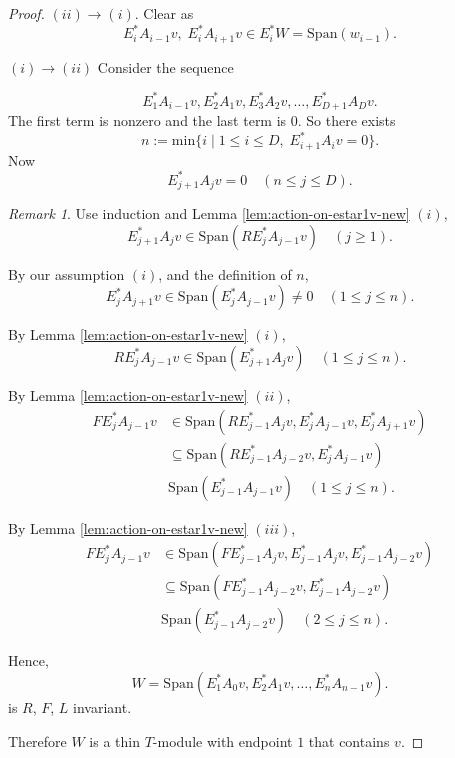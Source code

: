 \documentclass[
]{book}
\theoremstyle{definition}
\theoremstyle{definition}
\theoremstyle{definition}
\theoremstyle{definition}
\theoremstyle{remark}
\newtheorem*{remark}{Remark}
\begin{document}
\begin{proof}
\((ii)\to(i)\). Clear as
\[E^*_iA_{i-1}v, \; E^*_iA_{i+1}v \in E^*_iW = \mathrm{Span}(w_{i-1}).\]

\((i)\to(ii)\) Consider the sequence

\[E^*_1A_{i-1}v, E^*_2A_1v, E^*_3A_2v, \ldots, E^*_{D+1}A_Dv.\]
The first term is nonzero and the last term is \(0\).
So there exists
\[n := \mathrm{min}\{i\mid 1\leq i\leq D, \; E^*_{i+1}A_iv = 0\}.\]
Now
\begin{equation}
E^*_{j+1}A_jv = 0 \quad (n\leq j\leq D). \label{eq:n}
\end{equation}

\begin{remark}
Use induction and Lemma \ref{lem:action-on-estar1v-new} \((i)\),
\[E^*_{j+1}A_jv \in \mathrm{Span}(RE^*_jA_{j-1}v) \quad (j\geq 1).\]
\end{remark}

By our assumption \((i)\), and the definition of \(n\),
\[E^*_jA_{j+1}v \in \mathrm{Span}(E^*_jA_{j-1}v)\neq 0 \quad (1\leq j\leq n).\]

By Lemma \ref{lem:action-on-estar1v-new} \((i)\),
\[RE^*_jA_{j-1}v \in \mathrm{Span}(E^*_{j+1}A_jv) \quad (1\leq j\leq n).\]

By Lemma \ref{lem:action-on-estar1v-new} \((ii)\),
\begin{align}
FE^*_jA_{j-1}v & \in \mathrm{Span}(RE^*_{j-1}A_jv, E^*_jA_{j-1}v, E^*_jA_{j+1}v)\\
& \subseteq \mathrm{Span}(RE^*_{j-1}A_{j-2}v, E^*_jA_{j-1}v)\\
& \mathrm{Span}(E^*_{j-1}A_{j-1}v) \quad (1\leq j\leq n).
\end{align}

By Lemma \ref{lem:action-on-estar1v-new} \((iii)\),
\begin{align}
FE^*_jA_{j-1}v & \in \mathrm{Span}(FE^*_{j-1}A_j v, E^*_{j-1}A_{j}v, E^*_{j-1}A_{j-2}v)\\
& \subseteq \mathrm{Span}(FE^*_{j-1}A_{j-2}v, E^*_{j-1}A_{j-2}v)\\
& \mathrm{Span}(E^*_{j-1}A_{j-2}v) \quad (2\leq j\leq n).
\end{align}

Hence,
\[W = \mathrm{Span}(E^*_1A_0v, E^*_2A_1v, \ldots, E^*_nA_{n-1}v).\]
is \(R\), \(F\), \(L\) invariant.

Therefore \(W\) is a thin \(T\)-module with endpoint \(1\) that contains \(v\).
\end{proof}
\end{document}

